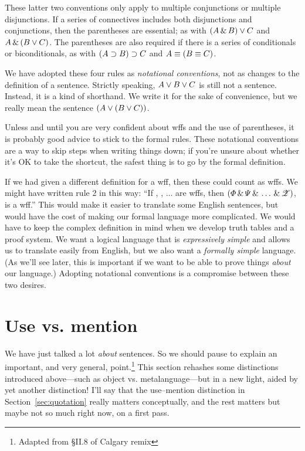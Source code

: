 These latter two conventions only apply to multiple conjunctions or multiple  disjunctions. If a series of connectives includes both disjunctions and conjunctions, then the parentheses are essential; as with $(A \,\&\, B) \vee C$ and $A \,\&\, (B \vee C)$. The parentheses are also required if there is a series of conditionals or biconditionals, as with $(A \supset B) \supset C$ and $A \equiv (B \equiv C)$.

We have adopted these four rules as \emph{notational conventions}, not as changes to the definition of a sentence. Strictly speaking, $A \vee B \vee C$ is still not a sentence. Instead, it is a kind of shorthand. We write it for the sake of convenience, but we really mean the sentence $(A \vee (B \vee C))$.

Unless and until you are very confident about wffs and the use of parentheses, it is probably good advice to stick to the formal rules. These notational conventions are a way to skip steps when writing things down; if you're unsure about whether it's OK to take the shortcut, the safest thing is to go by the formal definition.

If we had given a different definition for a wff, then these could count as wffs. We might have written rule 2 in this way: ``If \metaA{}, \metaB{}, $\ldots$  are wffs, then $(\varPhi{}\,\&\,\varPsi{}\,\&\,\ldots\,\&\,\mathscr{Z})$, is a wff.'' This would make it easier to translate some English sentences, but would have the cost of making our formal language more complicated. We would have to keep the complex definition in mind when we develop truth tables and a proof system. We want a logical language that is \emph{expressively simple} and allows us to translate easily from English, but we also want a \emph{formally simple} language. (As we'll see later, this is important if we want to be able to prove things \emph{about} our language.) Adopting notational conventions is a compromise between these two desires.


\section{Use vs. mention}\label{s:UseMention}
We have just talked a lot \emph{about} sentences. So we should pause to explain an important, and very general, point.\footnote{Adapted from \S II.8 of Calgary remix} {\color{black}This section rehashes some distinctions introduced above---such as object vs. metalanguage---but in a new light, aided by yet another distinction! I'll say that the use--mention distinction in Section~\ref{sec:quotation} really matters conceptually, and the rest matters but maybe not so much right now, on a first pass.} 

